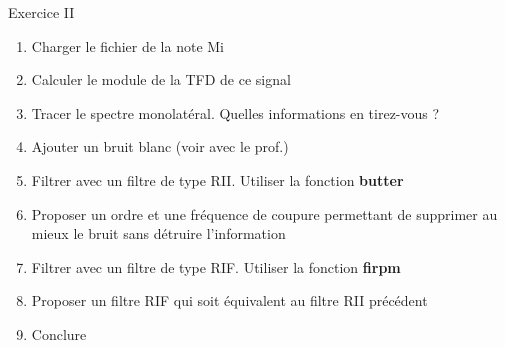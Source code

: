 \documentclass{beamer}
\begin{document}
\begin{frame}
\begin{exampleblock}{Exercice II}
\begin{enumerate}
  \item Charger le fichier de la note Mi
  \item Calculer le module de la TFD de ce signal
  \item Tracer le spectre monolatéral. Quelles informations en tirez-vous ?
  \item Ajouter un bruit blanc (voir avec le prof.)
  \item Filtrer avec un filtre de type RII. Utiliser la fonction \textbf{butter}
  \item Proposer un ordre et une fréquence de coupure permettant de supprimer au
  mieux le bruit sans détruire l'information
  \item Filtrer avec un filtre de type RIF. Utiliser la fonction \textbf{firpm}
  \item Proposer un filtre RIF qui soit équivalent au filtre RII précédent
  \item Conclure
\end{enumerate}
\end{exampleblock}
\end{frame}
\end{document}
